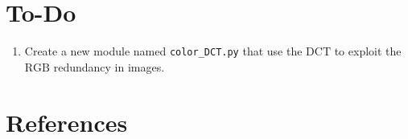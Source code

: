 \section*{To-Do}
\begin{enumerate}
\item Create a new module named \texttt{color\_DCT.py} that use the
  $\text{DCT}$ to exploit the $\text{RGB}$ redundancy in images.
\end{enumerate}

\section{References}

\renewcommand{\addcontentsline}[3]{}%

